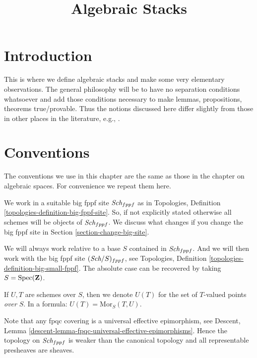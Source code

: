 

%


\title{Algebraic Stacks}


\maketitle

\label{section-phantom}

\tableofcontents

\section{Introduction}
\label{section-introduction}

\noindent
This is where we define algebraic stacks and make some very elementary
observations. The general philosophy will be to have no separation
conditions whatsoever and add those conditions necessary to make lemmas,
propositions, theorems true/provable. Thus the notions discussed here
differ slightly from those in other places in the literature, e.g.,
\cite{LM-B}.



\section{Conventions}
\label{section-conventions}

\noindent
The conventions we use in this chapter are the same as those in the
chapter on algebraic spaces. For convenience we repeat them here.

\medskip\noindent
We work in a suitable big fppf site $\textit{Sch}_{fppf}$
as in Topologies, Definition \ref{topologies-definition-big-fppf-site}.
So, if not explicitly stated otherwise all schemes will be objects
of $\textit{Sch}_{fppf}$. We discuss what changes if you change the big
fppf site in
Section \ref{section-change-big-site}.

\medskip\noindent
We will always work relative to a base $S$ contained in $\textit{Sch}_{fppf}$.
And we will then work with the big fppf site $(\textit{Sch}/S)_{fppf}$, see
Topologies, Definition \ref{topologies-definition-big-small-fppf}.
The absolute case can be recovered by taking
$S = \mathop{\rm Spec}(\mathbf{Z})$.

\medskip\noindent
If $U, T$ are schemes over $S$, then we denote
$U(T)$ for the set of $T$-valued points {\it over} $S$.
In a formula: $U(T) = \text{Mor}_S(T, U)$.

\medskip\noindent
Note that any fpqc covering is a universal effective
epimorphism, see
Descent, Lemma \ref{descent-lemma-fpqc-universal-effective-epimorphisms}.
Hence the topology on $\textit{Sch}_{fppf}$
is weaker than the canonical topology and all representable presheaves
are sheaves.








